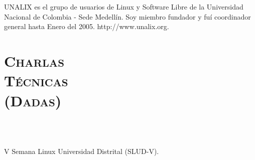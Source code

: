 \begin{resume}
\begin{formatb}
  \\
   
  \body\\
\end{formatb}

\begin{position}
UNALIX es el grupo de usuarios de Linux y Software Libre de la
Universidad Nacional de Colombia - Sede Medell\'{i}n. Soy miembro
fundador y fu\'{i} coordinador general hasta Enero del 2005. http://www.unalix.org.
\end{position}
\newline     
\newline
\newline
\newline     
\newline


\section{\textsc{Charlas \\ T\'{e}cnicas \\ (Dadas)}}

\begin{formatb}
  \\
  \\
   \body
\end{formatb}

\begin{position}
V Semana Linux Universidad Distrital (SLUD-V).
\end{position}



\end{resume}
